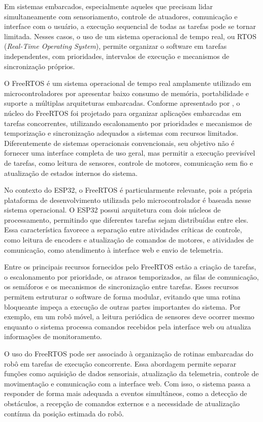 \documentclass[	12pt, Times, openright, twoside, a4paper, english, brazil]{abntex2}
\begin{document}
Em sistemas embarcados, especialmente aqueles que precisam lidar simultaneamente com sensoriamento, controle de atuadores, comunicação e interface com o usuário, a execução sequencial de todas as tarefas pode se tornar limitada. Nesses casos, o uso de um sistema operacional de tempo real, ou RTOS (\textit{Real-Time Operating System}), permite organizar o software em tarefas independentes, com prioridades, intervalos de execução e mecanismos de sincronização próprios.

O FreeRTOS é um sistema operacional de tempo real amplamente utilizado em microcontroladores por apresentar baixo consumo de memória, portabilidade e suporte a múltiplas arquiteturas embarcadas. Conforme apresentado por , o núcleo do FreeRTOS foi projetado para organizar aplicações embarcadas em tarefas concorrentes, utilizando escalonamento por prioridades e mecanismos de temporização e sincronização adequados a sistemas com recursos limitados. Diferentemente de sistemas operacionais convencionais, seu objetivo não é fornecer uma interface completa de uso geral, mas permitir a execução previsível de tarefas, como leitura de sensores, controle de motores, comunicação sem fio e atualização de estados internos do sistema.

No contexto do ESP32, o FreeRTOS é particularmente relevante, pois a própria plataforma de desenvolvimento utilizada pelo microcontrolador é baseada nesse sistema operacional. O ESP32 possui arquitetura com dois núcleos de processamento, permitindo que diferentes tarefas sejam distribuídas entre eles. Essa característica favorece a separação entre atividades críticas de controle, como leitura de encoders e atualização de comandos de motores, e atividades de comunicação, como atendimento à interface web e envio de telemetria.

Entre os principais recursos fornecidos pelo FreeRTOS estão a criação de tarefas, o escalonamento por prioridade, os atrasos temporizados, as filas de comunicação, os semáforos e os mecanismos de sincronização entre tarefas. Esses recursos permitem estruturar o software de forma modular, evitando que uma rotina bloqueante impeça a execução de outras partes importantes do sistema. Por exemplo, em um robô móvel, a leitura periódica de sensores deve ocorrer mesmo enquanto o sistema processa comandos recebidos pela interface web ou atualiza informações de monitoramento.

O uso do FreeRTOS pode ser associado à organização de rotinas embarcadas do robô em tarefas de execução concorrente. Essa abordagem permite separar funções como aquisição de dados sensoriais, atualização da telemetria, controle de movimentação e comunicação com a interface web. Com isso, o sistema passa a responder de forma mais adequada a eventos simultâneos, como a detecção de obstáculos, a recepção de comandos externos e a necessidade de atualização contínua da posição estimada do robô.
\end{document}
